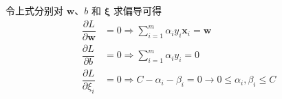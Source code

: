 令上式分别对 $\boldsymbol w$、$b$ 和 $\boldsymbol \xi$ 求偏导可得
\begin{equation}
    \begin{aligned}
        \dfrac {\partial L}{\partial \boldsymbol w} &= 0 \Longrightarrow \sum_{i = 1}^m \alpha_iy_i\boldsymbol x_i = \boldsymbol w \\
        \dfrac {\partial L}{\partial b} &= 0 \Longrightarrow \sum_{i = 1}^m \alpha_iy_i = 0 \\
        \dfrac {\partial L}{\partial \xi_i} &= 0 \Longrightarrow C - \alpha_i - \beta_i =0 \rightarrow 0 \leq \alpha_i, \beta_i \leq C
     \end{aligned}
\end{equation}